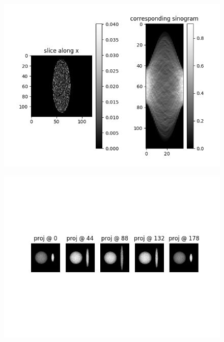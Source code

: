 \documentclass[slidestop,compress,12pt]{beamer}
\begin{document}
\begin{frame}
    \begin{figure}
        \includegraphics[scale=0.5,left]{imgs/sinogram.png}
    \end{figure}\pause
    \vspace{-3cm}
    \begin{figure}
        \includegraphics[scale=0.5,right]{imgs/projections.png}
    \end{figure}
\end{frame}
\end{document}
